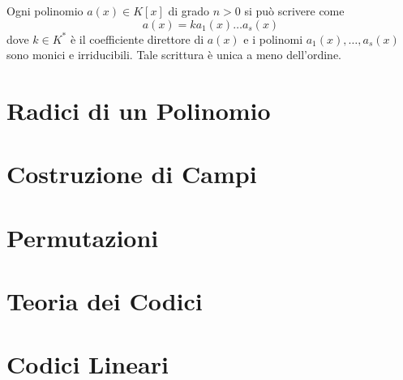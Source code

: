 \documentclass[a4paper,12pt, oneside]{book}
\begin{document}
			\begin{corollario}
				Ogni polinomio $a(x) \in K[x]$ di grado $n>0$ si può scrivere come 
				$$a(x) = ka_1(x) \dots a_s(x)$$
				dove $k \in K^{*}$ è il coefficiente direttore di $a(x)$ e i polinomi $a_1(x), \dots, a_s(x)$ sono monici e irriducibili. Tale scrittura è unica a meno dell'ordine.
			\end{corollario}
			

\chapter{Radici di un Polinomio}
\chapter{Costruzione di Campi}
\chapter{Permutazioni}
\chapter{Teoria dei Codici}
\chapter{Codici Lineari}
			
		
	
\end{document}
